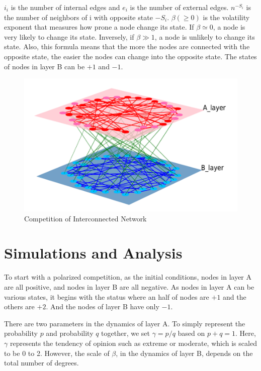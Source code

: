 \documentclass[english]{cccconf}
\begin{document}
$i_i$ is the number of internal edges and $e_i$ is the number of external edges. $n^{-S_i}$ is the number of neighbors of i with opposite state $-S_i$. $\beta(\geq 0)$ is the volatility exponent that measures how prone a node change its state. If $\beta \simeq 0$, a node is very likely to change its state. Inversely, if $\beta \gg 1$, a node is unlikely to change its state. Also, this formula means that the more the nodes are connected with the opposite state, the easier the nodes can change into the opposite state.
The states of nodes in layer B can be $+1$ and $-1$. \\
\begin{figure}[!htb]
  \centering
  \includegraphics[width=\hsize]{FIG1.png}
  \caption{Competition of Interconnected Network}
  \label{Fig1}
\end{figure}


\section{Simulations and Analysis}
To start with a polarized competition, as the initial conditions,  nodes in layer A are all positive, and nodes in layer B are all negative. As nodes in layer A can be various states, it begins with the status where an half of nodes are $+1$ and the others are $+2$. And the nodes of layer B have only $-1$. 

There are two parameters in the dynamics of layer A. To simply represent the probability $p$ and probability $q$ together, we set $\gamma = p/q$ based on $p+q=1$. Here, $\gamma$ represents the tendency of opinion such as extreme or moderate, which is scaled to be 0 to 2. However, the scale of $\beta$, in the dynamics of layer B, depends on the total number of degrees. 
\end{document}

